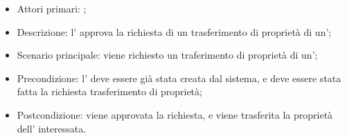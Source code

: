 \documentclass[../analisi-dei-requisiti]{subfiles}
\begin{document}
\begin{itemize}
\item Attori primari: ;
\item Descrizione: l' approva la richiesta di un trasferimento di proprietà di un';
\item Scenario principale: viene richiesto un traferimento di proprietà di un';
\item Precondizione: l' deve essere già stata creata dal sistema, e deve essere stata fatta la richiesta trasferimento di proprietà;
\item Postcondizione: viene approvata la richiesta, e viene trasferita la proprietà dell' interessata.

\end{itemize}
\end{document}
